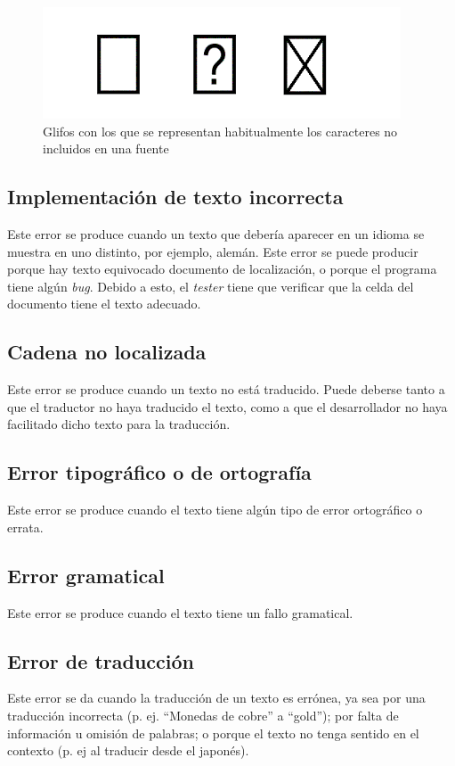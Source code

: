 \begin{figure}[H]

	\centering
	\includegraphics{Imagenes/BugsLQA/Notdef.png}
	\caption{Glifos con los que se representan habitualmente los caracteres no incluidos en una fuente}
	\label{Notdef}
\end{figure}
	
\subsection{Implementación de texto incorrecta}\label{ErrorImpIncorrecta}
Este error se produce cuando un texto que debería aparecer en un idioma se muestra en uno distinto, por ejemplo, alemán. Este error se puede producir porque hay texto equivocado documento de localización, o porque el programa tiene algún \textit{bug}. Debido a esto, el \textit{tester} tiene que verificar que la celda del documento tiene el texto adecuado.  
\subsection{Cadena no localizada}\label{ErrorNoLocalizada}
Este error se produce cuando un texto no está traducido. Puede deberse tanto a que el traductor no haya traducido el texto, como a que el desarrollador no haya facilitado dicho texto para la traducción. 
\subsection{Error tipográfico o de ortografía}\label{ErrorTypo}
Este error se produce cuando el texto tiene algún tipo de error ortográfico o errata.

\subsection{Error gramatical}\label{ErrorGramatical}
Este error se produce cuando el texto tiene un fallo gramatical.

\subsection{Error de traducción}\label{ErrorTraducción}
Este error se da cuando la traducción de un texto es errónea, ya sea por una traducción incorrecta (p. ej. ``Monedas de cobre'' a ``gold''); por falta de información u omisión de palabras; o porque el texto no tenga sentido en el contexto (p. ej al traducir desde el japonés).


